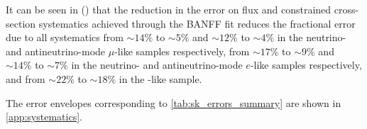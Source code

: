 It can be seen in  () that the reduction in the error on flux and constrained cross-section systematics achieved through the BANFF fit reduces the fractional error due to all systematics from $\sim 14\%$ to $\sim 5\%$ and $\sim 12\%$ to $\sim 4\%$ in the neutrino- and antineutrino-mode $\mu$-like samples respectively, from $\sim 17\%$ to $\sim 9\%$ and $\sim 14\%$ to $\sim 7\%$ in the neutrino- and antineutrino-mode $e$-like samples respectively, and from $\sim 22\%$ to $\sim 18\%$ in the \nueCConepi{}-like sample.



The error envelopes corresponding to \cref{tab:sk_errors_summary} are shown in \cref{app:systematics}.

\clearpage



